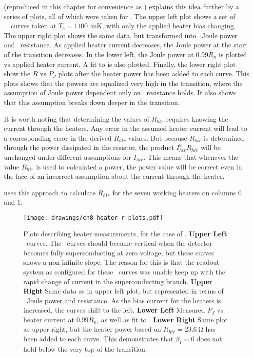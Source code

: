  (reproduced in this chapter for convenience as ) explains this idea further by a series of plots, all of which were taken for .
The upper left plot shows a set of \TES\ \IV\ curves taken at $T_b = 1100$~mK, with only the applied heater bias changing.
The upper right plot shows the same data, but transformed into \TES\ Joule power and \TES\ resistance.
As applied heater current decreases, the Joule power at the start of the transition decreases.
In the lower left, the Joule power at $0.99R_{n}$ is plotted vs applied heater current.
A fit to  is also plotted.
Finally, the lower right plot show the $R$ vs $P_J$ plots after the heater power has been added to each curve.
This plots shows that the powers are equalized very high in the transition, where the assumption of Joule power dependent only on \TES\ resistance holds.
It also shows that this assumption breaks down deeper in the transition.

It is worth noting that determining the values of $R_{htr}$ requires knowing the current through the heaters.
Any error in the assumed heater current will lead to a corresponding error in the derived $R_{htr}$ values.
But because $R_{htr}$ is determined through the power dissipated in the resistor, the product $I_{htr}^2 R_{htr}$ will be unchanged under different assumptions for $I_{htr}$.
This means that whenever the value $R_{htr}$ is used to calculated a power, the power value will be correct even in the face of an incorrect assumption about the current through the heater.

 uses this approach to calculate $R_{htr}$ for the seven working heaters on columns 0 and 1.

\begin{figure*}
\texttt{[image: drawings/ch8-heater-r-plots.pdf]}
\caption{Plots describing heater measurements, for the case of .
\textbf{Upper Left} \IV\ curves. The \IV\ curves should become vertical when the detector becomes fully superconducting at zero voltage, but these curves shows a non-infinite slope. The reason for this is that the readout system as configured for these \IV\ curves was unable keep up with the rapid change of current in the superconducting branch.
\textbf{Upper Right} Same data as in upper left plot, but represented in terms of \TES\ Joule power and resistance. As the bias current for the heaters is increased, the curves shift to the left.
\textbf{Lower Left} Measured $P_{J}$ vs heater current at $0.99R_n$, as well as fit to .
\textbf{Lower Right} Same plot as upper right, but the heater power based on $R_{htr} = \SI{23.6}{\ohm}$ has been added to each curve.
This demonstrates that $\beta_I = 0$ does not hold below the very top of the transition.}
\label{fig:ch3-heater-r-plots}
\end{figure*}

